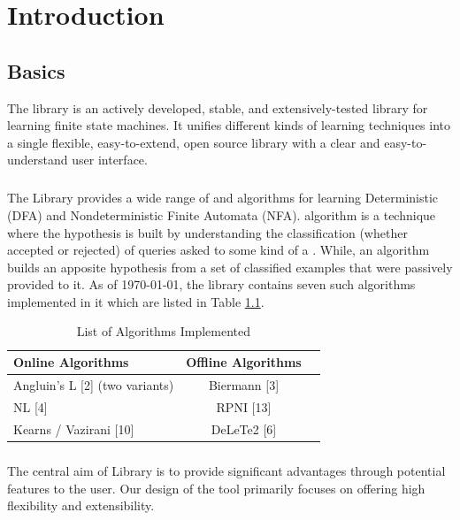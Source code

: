 
\chapter{Introduction}

\section{\libalf Basics}
		The \libalf library is an actively developed, stable, and extensively-tested library for learning finite state machines. It unifies different kinds of learning techniques into a single flexible, easy-to-extend, open source library with a clear and easy-to-understand user interface.
		\paragraph{}	
		The \libalf Library provides a wide range of \online and \offline algorithms for learning Deterministic (DFA) and Nondeterministic Finite Automata (NFA). \online algorithm is a technique where the hypothesis is built by understanding the classification (whether accepted or rejected) of queries asked to some kind of a \teacher.  While, an \offline algorithm builds an apposite hypothesis from a set of classified examples that were passively provided to it. As of \today, the library contains seven such algorithms implemented in it which are listed in Table \ref{algtables}.

		\begin{table}
		\centering
		\begin{tabular}[c]{lcr}
		\toprule[1pt]
			Online Algorithms & Offline Algorithms \\	
		\midrule
			Angluin's L [2] (two variants) & Biermann [3] \\
			NL [4] & RPNI [13] \\
			Kearns / Vazirani [10] & DeLeTe2 [6]\\
		\bottomrule[1pt]
		\end{tabular}
		\caption{List of Algorithms Implemented}
		\label{algtables}
		\end{table}
		
	  \paragraph{}	
		The central aim of \libalf Library is to provide significant advantages through potential features to the user. Our design of the tool primarily focuses on offering high flexibility and extensibility. 
